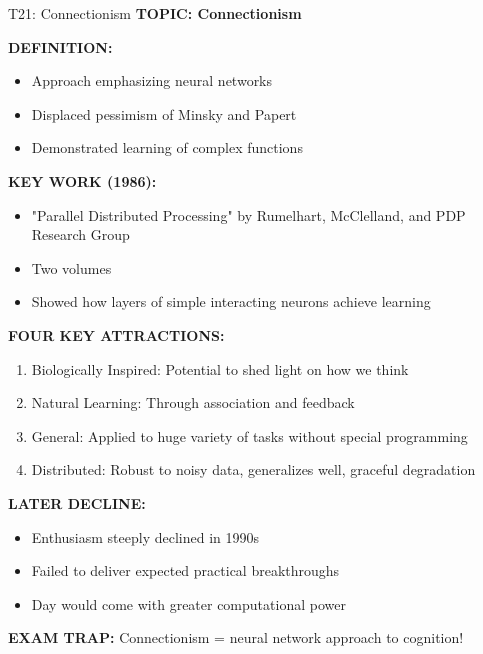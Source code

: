 \documentclass[8pt]{beamer}
\begin{document}
	\begin{frame}{T21: Connectionism}
		\fontsize{6.5}{7.5}\selectfont
		\textbf{TOPIC: Connectionism}
		
		\vspace{0.1cm}
		\textbf{DEFINITION:}
		\begin{itemize}
			\item Approach emphasizing neural networks
			\item Displaced pessimism of Minsky and Papert
			\item Demonstrated learning of complex functions
		\end{itemize}
		
		\vspace{0.1cm}
		\textbf{KEY WORK (1986):}
		\begin{itemize}
			\item "Parallel Distributed Processing" by Rumelhart, McClelland, and PDP Research Group
			\item Two volumes
			\item Showed how layers of simple interacting neurons achieve learning
		\end{itemize}
		
		\vspace{0.1cm}
		\textbf{FOUR KEY ATTRACTIONS:}
		\begin{enumerate}
			\item \textcolor{myblue}{Biologically Inspired:} Potential to shed light on how we think
			\item \textcolor{myblue}{Natural Learning:} Through association and feedback
			\item \textcolor{myblue}{General:} Applied to huge variety of tasks without special programming
			\item \textcolor{myblue}{Distributed:} Robust to noisy data, generalizes well, graceful degradation
		\end{enumerate}
		
		\vspace{0.1cm}
		\textbf{LATER DECLINE:}
		\begin{itemize}
			\item Enthusiasm steeply declined in 1990s
			\item Failed to deliver expected practical breakthroughs
			\item Day would come with greater computational power
		\end{itemize}
		
		\textcolor{myred}{\textbf{EXAM TRAP:}} Connectionism = \textcolor{myblue}{neural network approach} to cognition!
	\end{frame}
	
\end{document}
